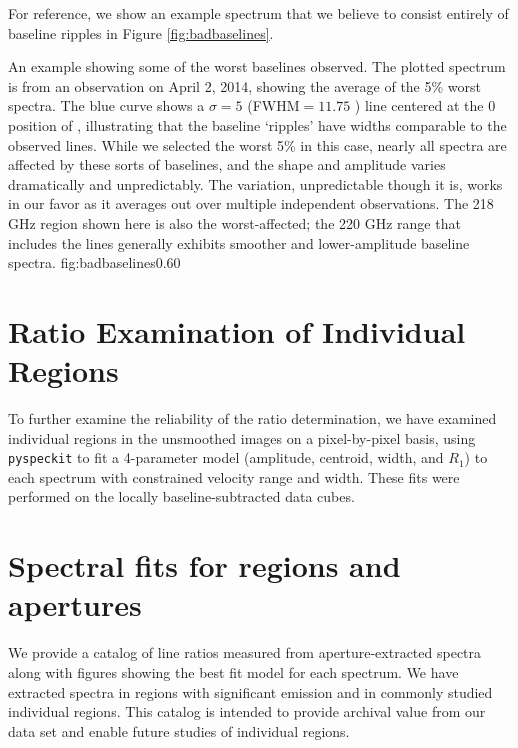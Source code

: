 For reference, we show an example spectrum that we believe to consist entirely
of baseline ripples in Figure \ref{fig:badbaselines}.

{An example showing some of the worst baselines observed.  The plotted spectrum
is from an observation on April 2, 2014, showing the average of the 5\% worst
spectra.  The blue curve shows a $\sigma=5$ \kms (FWHM$=11.75$ \kms) line centered
at the 0 \kms position of \para \threeohthree,
illustrating that the baseline `ripples' have widths comparable to the observed
lines.  While we selected the worst 5\% in this case, nearly all spectra are
affected by these sorts of baselines, and the shape and amplitude varies
dramatically and unpredictably.  The variation, unpredictable though it is,
works in our favor as it averages out over multiple independent observations.
The 218 GHz region shown here is also the worst-affected; the 220 GHz range
that includes the \thirteenco lines generally exhibits smoother and
lower-amplitude baseline spectra.}
{fig:badbaselines}{0.6}{0}


\section{Ratio Examination of Individual Regions}
To further examine the reliability of the ratio determination, we have examined
individual regions in the unsmoothed images on a pixel-by-pixel basis, using
\texttt{pyspeckit} to fit a 4-parameter model (amplitude, centroid, width, and
$R_1$) to each spectrum with constrained velocity range and width.  These fits
were performed on the locally baseline-subtracted data cubes.

\section{Spectral fits for regions and apertures}
We provide a catalog of line ratios measured from aperture-extracted spectra
along with figures showing the best fit model for each spectrum.  We have
extracted spectra in regions with significant \para emission and in commonly
studied individual regions.  This catalog is intended to provide archival value
from our data set and enable future studies of individual regions.






